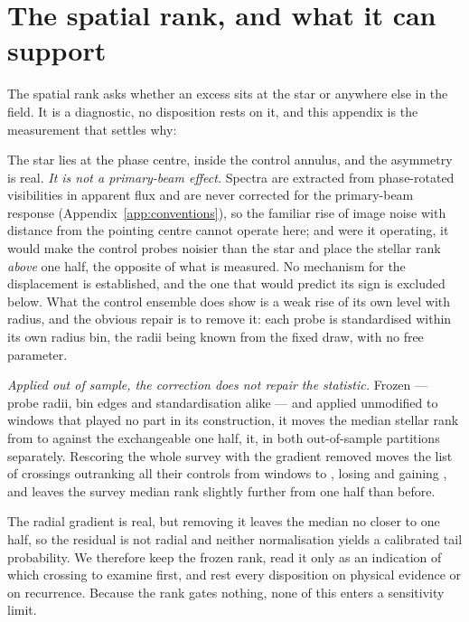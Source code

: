 \section{The spatial rank, and what it can support}
\label{app:radius}

The spatial rank asks whether an excess sits at the star or anywhere else in
the field. It is a diagnostic, no disposition rests on it, and this appendix
is the measurement that settles why: \rankstatus{}

The star lies at the phase centre, inside the control annulus, and the
asymmetry is real. \emph{It is not a primary-beam effect.} Spectra are
extracted from phase-rotated visibilities in apparent flux and are never
corrected for the primary-beam response (Appendix~\ref{app:conventions}), so
the familiar rise of image noise with distance from the pointing centre
cannot operate here; and were it operating, it would make the control probes
noisier than the star and place the stellar rank \emph{above} one half, the
opposite of what is measured. No mechanism for the displacement is
established, and the one that would predict its sign is excluded below. What
the control ensemble does show is
a weak rise of its own level with radius, and the obvious repair is to remove
it: each probe is standardised within its own radius bin, the radii being
known from the fixed draw, with no free parameter.

\emph{Applied out of sample, the correction does not repair the statistic.}
Frozen --- probe radii, bin edges and standardisation alike --- and applied
unmodified to \RadValStarN{} windows that played no part in its construction,
it moves the median stellar rank from \RadValStarRawMed{} to
\RadValStarCorMed{} against the exchangeable one half, \RadValStarToward{}
it, in both out-of-sample partitions separately. Rescoring the whole survey
with the gradient removed moves the list of crossings outranking all their
controls from \LocStageGlobal{} windows to \LocStageLocal, losing
\LocStageLost{} and gaining \LocStageGained, and leaves the survey median
rank slightly further from one half than before.

The radial gradient is real, but removing it leaves the median no closer to
one half, so the residual is not radial and neither normalisation yields a
calibrated tail probability. We therefore keep the frozen rank, read
it only as an indication of which crossing to examine first, and rest every
disposition on physical evidence or on recurrence. Because the rank gates
nothing, none of this enters a sensitivity limit.


